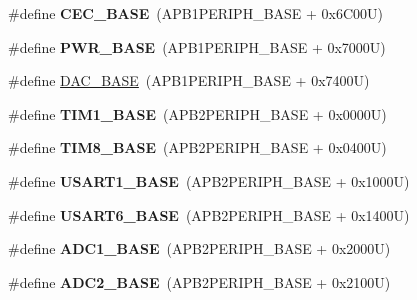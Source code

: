 \begin{DoxyCompactItemize}
\#define {\bfseries C\+E\+C\+\_\+\+B\+A\+SE}~(A\+P\+B1\+P\+E\+R\+I\+P\+H\+\_\+\+B\+A\+SE + 0x6\+C00\+U)
\item 
\mbox{\label{group___peripheral__memory__map_gac691ec23dace8b7a649a25acb110217a}} 
\#define {\bfseries P\+W\+R\+\_\+\+B\+A\+SE}~(A\+P\+B1\+P\+E\+R\+I\+P\+H\+\_\+\+B\+A\+SE + 0x7000\+U)
\item 
\#define \mbox{\hyperlink{group___peripheral__memory__map_gad18d0b914c7f68cecbee1a2d23a67d38}{D\+A\+C\+\_\+\+B\+A\+SE}}~(A\+P\+B1\+P\+E\+R\+I\+P\+H\+\_\+\+B\+A\+SE + 0x7400\+U)
\item 
\mbox{\label{group___peripheral__memory__map_gaf8aa324ca5011b8173ab16585ed7324a}} 
\#define {\bfseries T\+I\+M1\+\_\+\+B\+A\+SE}~(A\+P\+B2\+P\+E\+R\+I\+P\+H\+\_\+\+B\+A\+SE + 0x0000\+U)
\item 
\mbox{\label{group___peripheral__memory__map_ga5b72f698b7a048a6f9fcfe2efe5bc1db}} 
\#define {\bfseries T\+I\+M8\+\_\+\+B\+A\+SE}~(A\+P\+B2\+P\+E\+R\+I\+P\+H\+\_\+\+B\+A\+SE + 0x0400\+U)
\item 
\mbox{\label{group___peripheral__memory__map_ga86162ab3f740db9026c1320d46938b4d}} 
\#define {\bfseries U\+S\+A\+R\+T1\+\_\+\+B\+A\+SE}~(A\+P\+B2\+P\+E\+R\+I\+P\+H\+\_\+\+B\+A\+SE + 0x1000\+U)
\item 
\mbox{\label{group___peripheral__memory__map_gade4d3907fd0387ee832f426f52d568bb}} 
\#define {\bfseries U\+S\+A\+R\+T6\+\_\+\+B\+A\+SE}~(A\+P\+B2\+P\+E\+R\+I\+P\+H\+\_\+\+B\+A\+SE + 0x1400\+U)
\item 
\mbox{\label{group___peripheral__memory__map_ga695c9a2f892363a1c942405c8d351b91}} 
\#define {\bfseries A\+D\+C1\+\_\+\+B\+A\+SE}~(A\+P\+B2\+P\+E\+R\+I\+P\+H\+\_\+\+B\+A\+SE + 0x2000\+U)
\item 
\mbox{\label{group___peripheral__memory__map_ga6544abc57f9759f610eee09a02442ae6}} 
\#define {\bfseries A\+D\+C2\+\_\+\+B\+A\+SE}~(A\+P\+B2\+P\+E\+R\+I\+P\+H\+\_\+\+B\+A\+SE + 0x2100\+U)
\item 
\mbox{\label{group___peripheral__memory__map_gaca766f86c8e0b00a8e2b0224dcbb4c82}} 

\end{DoxyCompactItemize}
